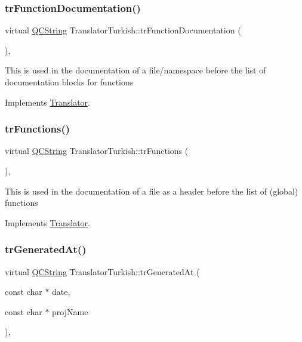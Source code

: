 \subsubsection{\texorpdfstring{trFunctionDocumentation()}{trFunctionDocumentation()}}
{\footnotesize\ttfamily virtual \mbox{\hyperlink{class_q_c_string}{Q\+C\+String}} Translator\+Turkish\+::tr\+Function\+Documentation (\begin{DoxyParamCaption}{ }\end{DoxyParamCaption})\hspace{0.3cm}{\ttfamily [inline]}, {\ttfamily [virtual]}}

This is used in the documentation of a file/namespace before the list of documentation blocks for functions 

Implements \mbox{\hyperlink{class_translator}{Translator}}.

\mbox{\label{class_translator_turkish_a972f6b4662d7b984b945051a7aa7dded}} 
\subsubsection{\texorpdfstring{trFunctions()}{trFunctions()}}
{\footnotesize\ttfamily virtual \mbox{\hyperlink{class_q_c_string}{Q\+C\+String}} Translator\+Turkish\+::tr\+Functions (\begin{DoxyParamCaption}{ }\end{DoxyParamCaption})\hspace{0.3cm}{\ttfamily [inline]}, {\ttfamily [virtual]}}

This is used in the documentation of a file as a header before the list of (global) functions 

Implements \mbox{\hyperlink{class_translator}{Translator}}.

\mbox{\label{class_translator_turkish_ae6a0134e9c5ccfe39559c397f9dbbc62}} 
\subsubsection{\texorpdfstring{trGeneratedAt()}{trGeneratedAt()}}
{\footnotesize\ttfamily virtual \mbox{\hyperlink{class_q_c_string}{Q\+C\+String}} Translator\+Turkish\+::tr\+Generated\+At (\begin{DoxyParamCaption}\item[{const char $\ast$}]{date,  }\item[{const char $\ast$}]{proj\+Name }\end{DoxyParamCaption})\hspace{0.3cm}{\ttfamily [inline]}, {\ttfamily [virtual]}}


